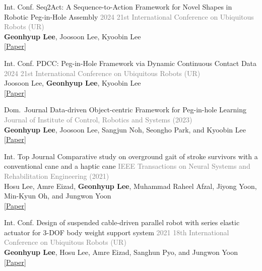 \documentclass[9pt]{developercv} %
\begin{document}
{\begin{entrylist}
    \entry
        {Int. Conf.}
        {Seq2Act: A Sequence-to-Action Framework for Novel Shapes in Robotic Peg-in-Hole Assembly} 
        {}
        {\vspace{0pt}
        \textcolor{gray}{2024 21st International Conference on Ubiquitous Robots (UR)} \\
        \textbf{Geonhyup Lee}, Joosoon Lee, Kyoobin Lee \\
        \textcolor{blue}{\href{https://ieeexplore.ieee.org/stamp/stamp.jsp?arnumber=10597529}{[Paper]}}
        }

    \entry
        {Int. Conf.}
        {PDCC: Peg-in-Hole Framework via Dynamic Continuous Contact Data} 
        {}
        {\vspace{0pt}
        \textcolor{gray}{2024 21st International Conference on Ubiquitous Robots (UR)} \\
        Joosoon Lee, \textbf{Geonhyup Lee}, Kyoobin Lee \\
        \textcolor{blue}{\href{https://ieeexplore.ieee.org/stamp/stamp.jsp?arnumber=10597516}{[Paper]}}
        }

   \entry
        {Dom.\ Journal}
        {Data-driven Object-centric Framework for Peg-in-hole Learning} 
        {}
        {\vspace{0pt}
        \textcolor{gray}{Journal of Institute of Control, Robotics and Systems (2023)} \\
        \textbf{Geonhyup Lee}, Joosoon Lee, Sangjun Noh, Seongho Park, and Kyoobin Lee  \\
        \textcolor{blue}{\href{https://scholar.kyobobook.co.kr/article/detail/4040049720749}{[Paper]}}
        }

    \entry
        {Int. Top Journal}
        {Comparative study on overground gait of stroke survivors with a conventional cane and a haptic cane} 
        {}
        {\vspace{0pt}
        \textcolor{gray}{IEEE Transactions on Neural Systems and Rehabilitation Engineering (2021)} \\
        Hosu Lee, Amre Eizad, \textbf{Geonhyup Lee}, Muhammad Raheel Afzal, Jiyong Yoon, Min-Kyun Oh, and Jungwon Yoon \\
        \textcolor{blue}{\href{https://ieeexplore.ieee.org/abstract/document/9580779}{[Paper]}}
        }

    \entry
        {Int. Conf.}
        {Design of suspended cable-driven parallel robot with series elastic actuator for 3-DOF body weight support system} 
        {}
        {\vspace{0pt}
        \textcolor{gray}{2021 18th International Conference on Ubiquitous Robots (UR)} \\
        \textbf{Geonhyup Lee}, Hosu Lee, Amre Eizad, Sanghun Pyo, and Jungwon Yoon \\
        \textcolor{blue}{\href{https://ieeexplore.ieee.org/abstract/document/9494688}{[Paper]}}
        }


\end{entrylist}}
\end{document}
